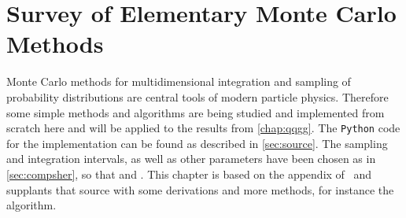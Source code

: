 
\chapter{Survey of Elementary Monte Carlo Methods}%
\label{chap:mc}

Monte Carlo methods for multidimensional integration and sampling of
probability distributions are central tools of modern particle
physics. Therefore some simple methods and algorithms are being
studied and implemented from scratch here and will be applied to the
results from \cref{chap:qqgg}. The \texttt{Python} code for the
implementation can be found as described in \cref{sec:source}. The
sampling and integration intervals, as well as other parameters have
been chosen as in \cref{sec:compsher}, so that 
and . This chapter is based on the
appendix of~\cite{buckley:2011ge} and supplants that source with some
derivations and more methods, for instance the
\vegas~\cite{Lepage:19781an} algorithm.
